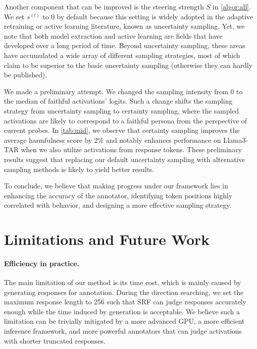 \documentclass{article}
\theoremstyle{plain}
\theoremstyle{definition}
\theoremstyle{remark}
\begin{document}
Another component that can be improved is the steering strength $S$ in \cref{algor:all}. We set $s^{(l)}$ to $0$ by default because this setting is widely adopted in the adaptive retraining or active learning literature, known as uncertainty sampling. Yet, we note that both model extraction and active learning are fields that have developed over a long period of time. Beyond uncertainty sampling, these areas have accumulated a wide array of different sampling strategies, most of which claim to be superior to the basic uncertainty sampling (otherwise they can hardly be published).

We made a preliminary attempt. We changed the sampling intensity from 0 to the median of faithful activations' logits. Such a change shifts the sampling strategy from uncertainty sampling to certainty sampling, where the sampled activations are likely to correspond to a faithful persona from the perspective of current probes. In \cref{tab:mid}, we observe that certainty sampling improves the average harmfulness score by 2\% and notably enhances performance on Llama3-TAR when we also utilize activations from response tokens. These preliminary results suggest that replacing our default uncertainty sampling with alternative sampling methods is likely to yield better results.

To conclude, we believe that making progress under our framework lies in enhancing the accuracy of the annotator, identifying token positions highly correlated with behavior, and designing a more effective sampling strategy.





\section{Limitations and Future Work}\label{app:discussion}

\paragraph{Efficiency in practice.} The main limitation of our method is its time cost, which is mainly caused by generating responses for annotation. During the direction searching, we set the maximum response length to 256 such that SRF can judge responses accurately enough while the time induced by generation is acceptable. We believe such a limitation can be trivially mitigated by a more advanced GPU, a more efficient inference framework, and more powerful annotators that can judge activations with shorter truncated responses.
\end{document}
